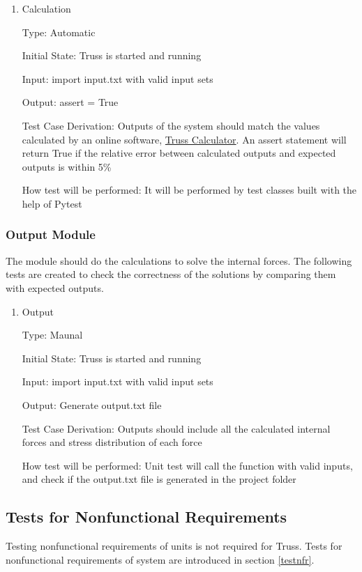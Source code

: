 \documentclass[12pt, titlepage]{article}
\begin{document}
\begin{enumerate}
	
	\item{Calculation\\}
	
	Type: Automatic
	
	Initial State: Truss is started and running
	
	Input: import input.txt with valid input sets
	
	Output: assert = True
	
	Test Case Derivation: Outputs of the system should match the values 
	calculated by an online software, 
	\href{https://skyciv.com/free-truss-calculator/}{Truss 
	Calculator}. An assert statement will return True if the relative error 
	between calculated outputs and expected outputs is within 5\%
	
	How test will be performed: It will be performed by test classes built with 
	the help of Pytest
	
\end{enumerate}

\subsubsection{Output Module} \label{output}
The module should do the calculations to solve the internal forces. The 
following tests are created to check the correctness of the solutions by 
comparing them with expected outputs. 

\begin{enumerate}
	
	\item{Output\\}
	
	Type: Maunal
	
	Initial State: Truss is started and running
	
	Input: import input.txt with valid input sets
	
	Output: Generate output.txt file 
	
	Test Case Derivation: Outputs should include all the calculated internal 
	forces and stress distribution of each force
	
	How test will be performed: Unit test will call the function with valid
	inputs, and check if the output.txt file is generated in the project folder
	
\end{enumerate}

\subsection{Tests for Nonfunctional Requirements}
Testing nonfunctional requirements of units is not required for Truss. Tests 
for nonfunctional requirements of system are introduced in section 
\ref{testnfr}.
\end{document}
